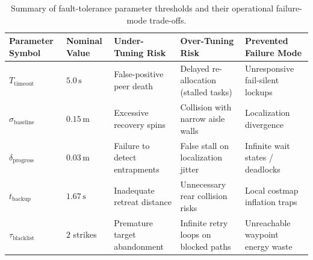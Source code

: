\begin{table}[htbp]
\centering
\small
\setlength{\tabcolsep}{5pt}
\caption{Summary of fault-tolerance parameter thresholds and their operational failure-mode trade-offs.}
\label{tab:fault_tolerance_parameters}
\begin{tabularx}{\textwidth}{@{}l l L L L@{}}
\toprule
\textbf{Parameter Symbol} & \textbf{Nominal Value} & \textbf{Under-Tuning Risk} & \textbf{Over-Tuning Risk} & \textbf{Prevented Failure Mode} \\ \midrule
$T_{\text{timeout}}$ & $5.0\,\text{s}$ & False-positive peer death & Delayed re-allocation (stalled tasks) & Unresponsive fail-silent lockups \\ \addlinespace
$\sigma_{\text{baseline}}$ & $0.15\,\text{m}$ & Excessive recovery spins & Collision with narrow aisle walls & Localization divergence \\ \addlinespace
$\delta_{\text{progress}}$ & $0.03\,\text{m}$ & Failure to detect entrapments & False stall on localization jitter & Infinite wait states / deadlocks \\ \addlinespace
$t_{\text{backup}}$ & $1.67\,\text{s}$ & Inadequate retreat distance & Unnecessary rear collision risks & Local costmap inflation traps \\ \addlinespace
$\tau_{\text{blacklist}}$ & $2$ strikes & Premature target abandonment & Infinite retry loops on blocked paths & Unreachable waypoint energy waste \\ \bottomrule
\end{tabularx}
\end{table}

